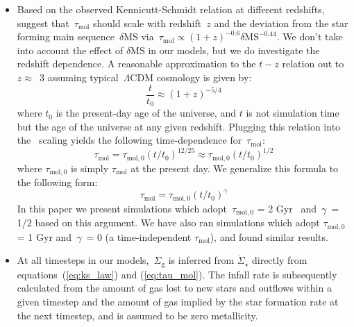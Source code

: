 \documentclass[fleqn, usenatbib]{mnras}
\newcommand{\refp}[1]{(\ref{#1})}
\begin{document}
\begin{itemize}
	\item Based on the observed Kennicutt-Schmidt relation at different 
	redshifts,~\citet{Tacconi2018} suggest that~$\tau_\text{mol}$ should 
	scale with redshift~$z$ and the deviation from the star forming main 
	sequence~$\delta\text{MS}$ via~$\tau_\text{mol} \propto (1 + z)^{-0.6} 
	\delta\text{MS}^{-0.44}$. We don't take into account the effect of 
	$\delta\text{MS}$ in our models, but we do investigate the redshift 
	dependence. A reasonable approximation to the $t-z$ relation out 
	to~$z \approx$~3 assuming typical~$\Lambda$CDM cosmology is given by: 
	\begin{equation} 
	\frac{t}{t_0} \approx (1 + z)^{-5/4} 
	\end{equation} 
	where $t_0$ is the present-day age of the universe, and $t$ is not 
	simulation time but the age of the universe at any given redshift. 
	Plugging this relation into the~\citet{Tacconi2018} scaling yields the 
	following time-dependence for~$\tau_\text{mol}$: 
	\begin{equation} 
	\tau_\text{mol} = \tau_{\text{mol},0}(t/t_0)^{12/25} \approx 
	\tau_{\text{mol},0}(t/t_0)^{1/2} 
	\end{equation} 
	where $\tau_{\text{mol},0}$ is simply $\tau_\text{mol}$ at the 
	present day. We generalize this formula to the following form: 
	\begin{equation} 
	\tau_\text{mol} = \tau_{\text{mol},0}(t/t_0)^\gamma 
	\label{eq:tau_mol}
	\end{equation} 
	In this paper we present simulations which adopt~$\tau_{\text{mol},0}$ 
	= 2 Gyr~\citep{Leroy2008, Leroy2013, Tacconi2018} and~$\gamma$~= 1/2 based 
	on this argument. We have also ran simulations which adopt 
	$\tau_{\text{mol},0}$ = 1 Gyr and~$\gamma$~= 0 (a time-independent 
	$\tau_{\text{mol}}$), and found similar results. 

	\item At all timesteps in our models,~$\Sigma_\text{g}$ is inferred from 
	$\dot{\Sigma}_\star$ directly from equations~\refp{eq:ks_law} and 
	\refp{eq:tau_mol}. The infall rate is subsequently calculated from the 
	amount of gas lost to new stars and outflows within a given timestep and 
	the amount of gas implied by the star formation rate at the next timestep, 
	and is assumed to be zero metallicity. 


\end{itemize}
\end{document}
